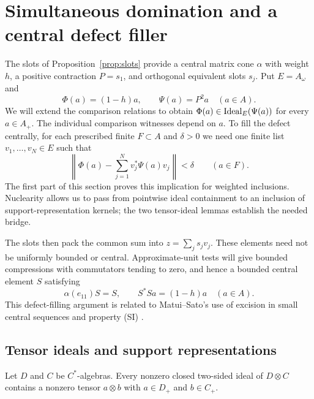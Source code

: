 \section{Simultaneous domination and a central defect filler}
\label{cen:section}

The slots of Proposition~\ref{prop:slots} provide a central matrix
cone $\alpha$ with weight $h$, a positive contraction $P=s_1$,
and orthogonal equivalent slots $s_j$.  Put $E=A_\omega$ and
\[
 \Phi(a)=(1-h)a,\qquad \Psi(a)=P^2a\quad(a\in A).
\]
We will extend the comparison relations to obtain
$\Phi(a)\in\operatorname{Ideal}_E(\Psi(a))$ for every $a\in A_+$.
The individual comparison witnesses depend on $a$.  To fill the
defect centrally, for each prescribed finite $F\subset A$ and
$\delta>0$ we need one finite list $v_1,\ldots,v_N\in E$ such that
\[
 \left\|\Phi(a)-\sum_{j=1}^N v_j^*\Psi(a)v_j\right\|<\delta
 \qquad(a\in F).
\]
The first part of this section proves this implication for weighted
inclusions.  Nuclearity allows us to pass from pointwise ideal
containment to an inclusion of support-representation kernels; the
two tensor-ideal lemmas establish the needed bridge.

The slots then pack the common sum into $z=\sum_j s_jv_j$.
These elements need not be uniformly bounded or central.
Approximate-unit tests will give bounded compressions with
commutators tending to zero, and hence a bounded central element
$S$ satisfying
\[
 \alpha(e_{11})S=S,\qquad S^*S a=(1-h)a\quad(a\in A).
\]
This defect-filling argument is related to Matui--Sato's use of
excision in small central sequences and property \textup{(SI)}
\cite{MatuiSato2012}.

\subsection{Tensor ideals and support representations}

\begin{lemma}\label{cen:elementary-tensor}
Let $D$ and $C$ be $C^*$-algebras.  Every nonzero closed two-sided ideal
of $D\otimes C$ contains a nonzero tensor $a\otimes b$ with
$a\in D_+$ and $b\in C_+$.
\end{lemma}

